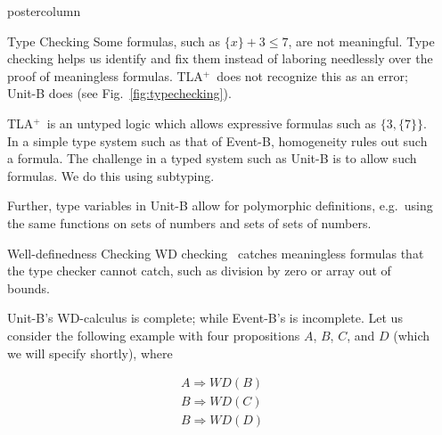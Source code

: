 \documentclass{beamer}
\newlength{\columnheight}
\newcommand{\tla}{TLA${}^+$}
\begin{document}
\begin{frame}
\begin{columns}
\begin{column}{.4\textwidth}
  \end{column}
  \begin{column}{.3\textwidth}
    \begin{beamercolorbox}[center]{postercolumn}
      \begin{minipage}{.98\textwidth} %
        \parbox[t][\columnheight]{\textwidth}{ %
          \renewcommand{\figurename}{Fig.}
          \begin{myblock}{Type Checking}
            Some formulas, such as $\{x\} + 3 \le 7$, are not meaningful. Type
            checking helps us identify and fix them instead of laboring
            needlessly over the proof of meaningless formulas. \tla\ does not
            recognize this as an error; Unit-B does (see
            \figurename~\ref{fig:typechecking}).
            \bigskip

            \tla\ is an untyped logic which allows expressive formulas such as
            $\{ 3, \{ 7 \} \}$. In a simple type system such as that of Event-B,
            homogeneity rules out such a formula. The challenge in a typed
            system such as Unit-B is to allow such formulas. We do this using
            subtyping.
            \bigskip

            Further, type variables in Unit-B allow for polymorphic definitions,
            e.g.\ using the same functions on sets of numbers and sets of sets
            of numbers.\newline
            \vspace{-1em}
          \end{myblock}
          \begin{myblock}{Well-definedness Checking}
            WD checking~\cite{DBLP:conf/cade/DarvasMR08} catches meaningless
            formulas that the type checker cannot catch, such as division by
            zero or array out of bounds.
            \bigskip

            Unit-B's WD-calculus is complete; while Event-B's is incomplete.
            Let us consider the following example with four propositions
            $A$, $B$, $C$, and $D$ (which we will specify shortly), where

            \vspace{-3ex}
            \begin{eqnarray*}
              A \Rightarrow WD(B) \\
              B \Rightarrow WD(C) \\
              B \Rightarrow WD(D)
            \end{eqnarray*}


\end{myblock}}
\end{minipage}
\end{beamercolorbox}
\end{column}
\end{columns}
\end{frame}
\end{document}
